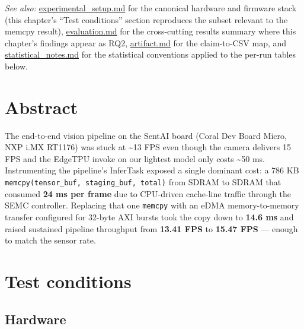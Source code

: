 \emph{See also:} \url{experimental_setup.md} for the canonical hardware
and firmware stack (this chapter's ``Test conditions'' section
reproduces the subset relevant to the memcpy result),
\url{evaluation.md} for the cross-cutting results summary where this
chapter's findings appear as RQ2, \url{artifact.md} for the claim-to-CSV
map, and \url{statistical_notes.md} for the statistical conventions
applied to the per-run tables below.

\section{Abstract}\label{abstract}

The end-to-end vision pipeline on the SentAI board (Coral Dev Board
Micro, NXP i.MX RT1176) was stuck at \textasciitilde13 FPS even though
the camera delivers 15 FPS and the EdgeTPU invoke on our lightest model
only costs \textasciitilde50 ms. Instrumenting the pipeline's InferTask
exposed a single dominant cost: a 786 KB
\texttt{memcpy(tensor\_buf,\ staging\_buf,\ total)} from SDRAM to SDRAM
that consumed \textbf{24 ms per frame} due to CPU-driven cache-line
traffic through the SEMC controller. Replacing that one \texttt{memcpy}
with an eDMA memory-to-memory transfer configured for 32-byte AXI bursts
took the copy down to \textbf{14.6 ms} and raised sustained pipeline
throughput from \textbf{13.41 FPS} to \textbf{15.47 FPS} --- enough to
match the sensor rate.

\section{Test conditions}\label{test-conditions}

\subsection{Hardware}\label{hardware}

